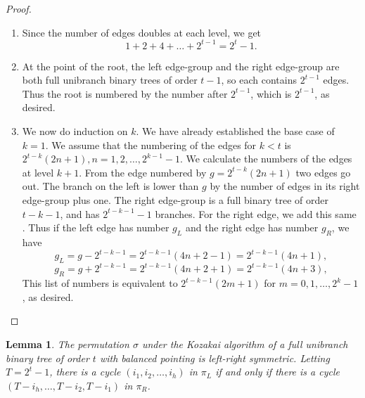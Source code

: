 \documentclass[11pt,english]{article}
\numberwithin{figure}{section}
\numberwithin{equation}{section}
\numberwithin{table}{section}
\newtheorem{lem}{Lemma}[section]
\theoremstyle{definition}
\theoremstyle{remark}
\begin{document}
\begin{proof}
	\begin{enumerate}
		\item Since the number of edges doubles at each level, we get
		\[
		1+2+4+\dots+2^{t-1}=2^t-1.
		\]
		\item At the point of the root, the left edge-group and the right edge-group are both full unibranch binary trees of order $t-1$, so each contains $2^{t-1}$ edges.  Thus the root is numbered by the number after $2^{t-1}$, which is $2^{t-1}$, as desired.
		\item We now do induction on $k$. We have already established the base case of $k=1$. We assume that the numbering of the edges for $k<t$ is 
		$2^{t-k}(2n+1), n=1,2,\dots, 2^{k-1}-1$.  We calculate the numbers of the edges at level $k+1$. From the edge numbered by $g=2^{t-k}(2n+1)$ two edges go out. The branch on the left is lower than $g$ by the number of edges in its right edge-group plus one.  The right edge-group is a full binary tree of order
		$t-k-1$, and has $2^{t-k-1}-1$ branches. For the right edge, we add this same . Thus if the left edge has  number $g_L$ and the right edge has number $g_R$, we have
		\[
		g_L=g-2^{t-k-1}=2^{t-k-1}(4n+2-1)=2^{t-k-1}(4n+1),
		\]
		\[
		g_R=g+2^{t-k-1}=2^{t-k-1}(4n+2+1)=2^{t-k-1}(4n+3),
		\]
		This list of numbers is equivalent to $2^{t-k-1}(2m+1)$ for $m=0,1,\dots,2^k-1$, as desired.
	\end{enumerate}
\end{proof}

\begin{lem}
	The permutation $\sigma$ under the Kozakai algorithm  of a full unibranch binary tree of order $t$ with balanced pointing  is left-right symmetric. Letting $T=2^t-1$, there is a cycle $(i_1,i_2, \dots, i_h)$ in $\pi_L$ if and only if there is a cycle $(T-i_h,\dots, T-i_2,T-i_1)$ in $\pi_R$.
\end{lem}
\end{document}
